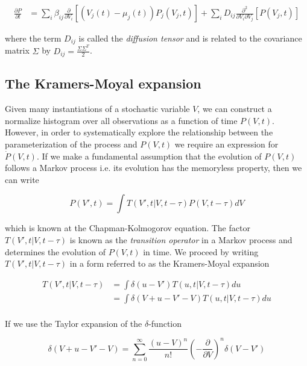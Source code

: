 \documentclass{ucetd}
\begin{document}
\begin{align}
\frac{\partial P}{\partial t} &= \sum_{i}
\beta_{ij}\frac{\partial}{\partial V_{i}}[\left(V_{j}(t)-\mu_{j}(t)\right) P_{j}(V_{j},t)] + \sum_{i}D_{ij}\frac{\partial^{2}}{\partial V_{i}\partial V_{j}}[P(V_{j},t)]
\end{align}

where the term $D_{ij}$ is called the \emph{diffusion tensor} and is related to the covariance matrix $\Sigma$ by $D_{ij} = \frac{\Sigma\Sigma^{T}}{2}$.


\begin{appendices}
\chapter{The Kramers-Moyal expansion}

Given many instantiations of a stochastic variable $V$, we can construct a normalize histogram over all observations as a function of time $P(V,t)$. However, in order to systematically explore the relationship between the parameterization of the process and $P(V,t)$ we require an expression for $\dot{P}(V,t)$. If we make a fundamental assumption that the evolution of $P(V,t)$ follows a Markov process i.e. its evolution has the memoryless property, then we can write

\begin{equation}
P(V', t) = \int T(V', t | V, t-\tau)P(V, t-\tau)dV
\end{equation} 

which is known at the Chapman-Kolmogorov equation. The factor $T(V', t | V, t-\tau)$ is known as the \emph{transition operator} in a Markov process and determines the evolution of $P(V,t)$ in time. We proceed by writing $T(V', t | V, t-\tau)$ in a form referred to as the Kramers-Moyal expansion

\begin{align*}
T(V', t | V, t-\tau) &= \int \delta(u-V')T(u, t | V, t-\tau)du\\
&= \int \delta(V+u-V'-V)T(u, t | V, t-\tau)du\\
\end{align*} 

If we use the Taylor expansion of the $\delta$-function 

\begin{equation*}
\delta(V+u-V'-V) = \sum_{n=0}^{\infty} \frac{(u-V)^{n}}{n!}\left(-\frac{\partial}{\partial V}\right)^{n}\delta(V-V')
\end{equation*}


\end{appendices}
\end{document}
